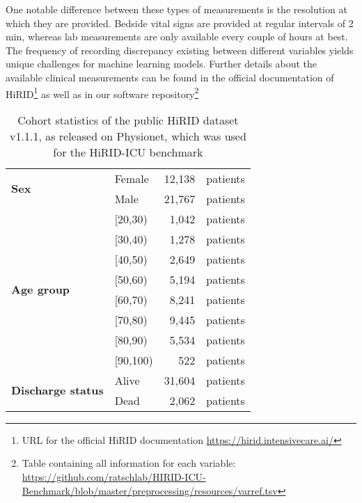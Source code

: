 \documentclass{article}
\begin{document}
One notable difference between these types of measurements is the resolution at which they are provided. Bedside vital signs are provided at regular intervals of 2 min, whereas lab measurements are only available every couple of hours at best. The frequency of recording discrepancy existing between different variables yields unique challenges for machine learning models. Further details about the available clinical measurements can be found in the official documentation of HiRID\footnote{URL for the official HiRID documentation \url{https://hirid.intensivecare.ai/}} as well as in our software repository\footnote{ Table containing all information for each variable: \url{https://github.com/ratschlab/HIRID-ICU-Benchmark/blob/master/preprocessing/resources/varref.tsv}}

\begin{table}[!ht]
    \centering
    \caption{Cohort statistics of the public HiRID dataset v1.1.1, as released on Physionet, 
    which was used for the HiRID-ICU benchmark}\label{tab:cohort_stats}
    {\selectfont\scriptsize
    \begin{tabular}{l l l r l}
    \toprule
         \multirow{2}{*}{\textbf{Sex}} & \multicolumn{2}{l}{Female} & 12,138 & patients \\ \cmidrule{2-5}
         & \multicolumn{2}{l}{Male} & 21,767 & patients \\ \midrule
         \multirow{8}{*}{\textbf{Age group}} & \multicolumn{2}{l}{[20,30)} & 1,042 & patients \\ \cmidrule{2-5}
         & \multicolumn{2}{l}{[30,40)} & 1,278 & patients \\ \cmidrule{2-5}
         & \multicolumn{2}{l}{[40,50)} & 2,649 & patients \\ \cmidrule{2-5}
         & \multicolumn{2}{l}{[50,60)} & 5,194 & patients \\ \cmidrule{2-5}
         & \multicolumn{2}{l}{[60,70)} & 8,241 & patients \\ \cmidrule{2-5}
         & \multicolumn{2}{l}{[70,80)} & 9,445 & patients \\ \cmidrule{2-5}
         & \multicolumn{2}{l}{[80,90)} & 5,534 & patients \\ \cmidrule{2-5}
         & \multicolumn{2}{l}{[90,100)} & 522 & patients \\ \midrule
         \multirow{3}{*}{\textbf{Discharge status}} & \multicolumn{2}{l}{Alive} & 31,604 & patients \\ \cmidrule{2-5}
         & \multicolumn{2}{l}{Dead} & 2,062 & patients \\ \cmidrule{2-5}

\end{tabular}}
\end{table}
\end{document}
